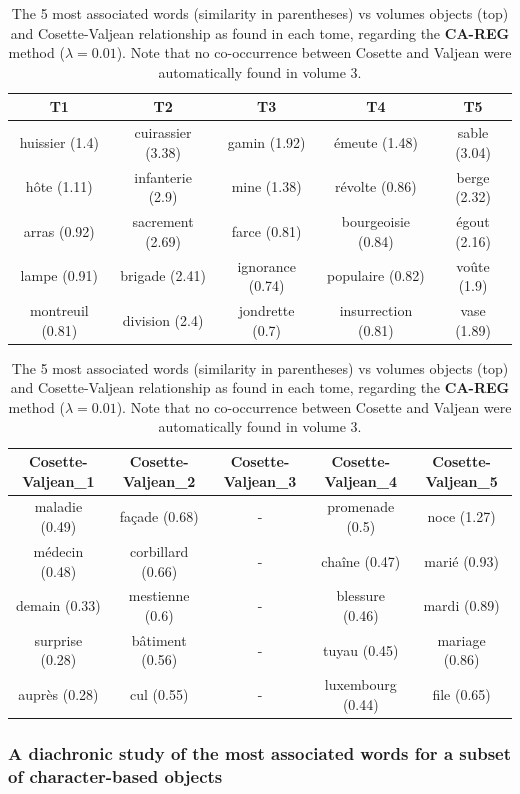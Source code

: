 \documentclass[
twocolumn,
]{ceurart}
\begin{document}
\begin{table}[!bh]
	\centering
	\begin{tabular}{|c|c|c|c|c|}
		\hline
		T1 & T2 & T3 & T4 & T5 \\ \hline
		huissier (1.4) & cuirassier (3.38) & gamin (1.92) & émeute (1.48) & sable (3.04) \\ \hline
		hôte (1.11) & infanterie (2.9) & mine (1.38) & révolte (0.86) & berge (2.32) \\ \hline
		arras (0.92) & sacrement (2.69) & farce (0.81) & bourgeoisie (0.84) & égout (2.16) \\ \hline
		lampe (0.91) & brigade (2.41) & ignorance (0.74) & populaire (0.82) & voûte (1.9) \\ \hline
		montreuil (0.81) & division (2.4) & jondrette (0.7) & insurrection (0.81) & vase (1.89) \\ 
		\hline
	\end{tabular}
	
	\begin{tabular}{|c|c|c|c|c|}
		\hline
		Cosette-Valjean\_1 & Cosette-Valjean\_2 & Cosette-Valjean\_3 & Cosette-Valjean\_4 & Cosette-Valjean\_5 \\ \hline
		maladie (0.49) & façade (0.68) & - & promenade (0.5) & noce (1.27) \\ \hline
		médecin (0.48) & corbillard (0.66) & - &chaîne (0.47) & marié (0.93) \\ \hline
		demain (0.33) & mestienne (0.6) & - & blessure (0.46) & mardi (0.89) \\ \hline
		surprise (0.28) & bâtiment (0.56) & - &tuyau (0.45) & mariage (0.86) \\ \hline
		auprès (0.28) & cul (0.55) & - &luxembourg (0.44) & file (0.65) \\ \hline
	\end{tabular}
	
	\label{CA_TIME_REG_word_vs_obj}
	\caption{The 5 most associated words (similarity in parentheses) vs volumes objects (top) and Cosette-Valjean relationship as found in each tome, regarding the \textbf{CA-REG} method ($\lambda = 0.01$). Note that no co-occurrence between Cosette and Valjean were automatically found in volume 3.}
\end{table}


\subsubsection{A diachronic study of the most associated words for a subset of character-based objects}
\label{diachronic}
\end{document}
